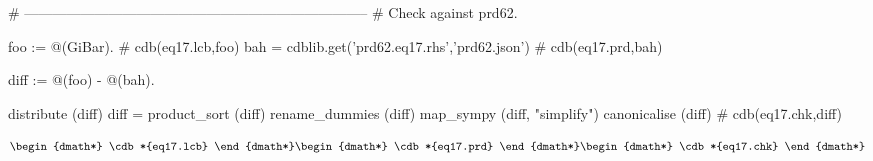 \documentclass[12pt]{cdblatex}
\begin{document}
\clearpage

\begin{cadabra}
   # --------------------------------------------------------------------------
   # Check against prd62.

   foo := @(GiBar).                                     # cdb(eq17.lcb,foo)
   bah  = cdblib.get('prd62.eq17.rhs','prd62.json')     # cdb(eq17.prd,bah)

   diff := @(foo) - @(bah).

   distribute     (diff)
   diff = product_sort (diff)
   rename_dummies (diff)
   map_sympy      (diff, "simplify")
   canonicalise   (diff)                                # cdb(eq17.chk,diff)
\end{cadabra}


\begin{dgroup*}
   \begin{dmath*} \cdb*{eq17.lcb} \end{dmath*}
   \begin{dmath*} \cdb*{eq17.prd} \end{dmath*}
   \begin{dmath*} \cdb*{eq17.chk} \end{dmath*}
\end{dgroup*}
\end{document}
